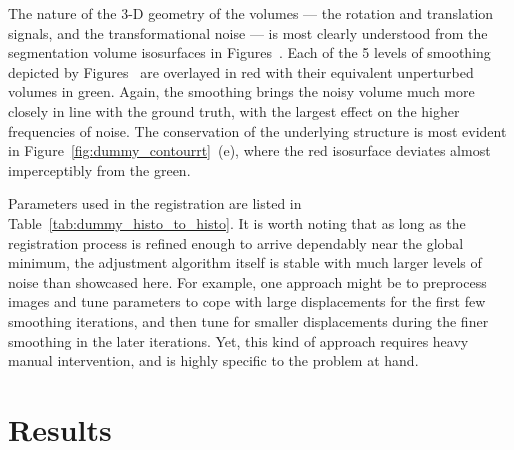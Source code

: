   The nature of the 3-D geometry of the volumes --- the rotation and translation signals, and the transformational noise --- is most clearly understood from the segmentation volume isosurfaces in Figures~. Each of the 5 levels of smoothing depicted by Figures~ are overlayed in red with their equivalent unperturbed volumes in green. Again, the smoothing brings the noisy volume much more closely in line with the ground truth, with the largest effect on the higher frequencies of noise. The conservation of the underlying structure is most evident in Figure~\ref{fig:dummy_contourrt}~(e), where the red isosurface deviates almost imperceptibly from the green.
  
  Parameters used in the registration are listed in Table~\ref{tab:dummy_histo_to_histo}. It is worth noting that as long as the registration process is refined enough to arrive dependably near the global minimum, the adjustment algorithm itself is stable with much larger levels of noise than showcased here. For example, one approach might be to preprocess images and tune parameters to cope with large displacements for the first few smoothing iterations, and then tune for smaller displacements during the finer smoothing in the later iterations. Yet, this kind of approach requires heavy manual intervention, and is highly specific to the problem at hand.

\section{Results} %
\label{sec:results}
